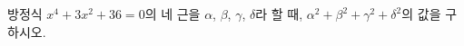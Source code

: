 방정식 $x^4+3x^2+36=0$의 네 근을 $\alpha$, $\beta$, $\gamma$, $\delta$라 할 때, $\alpha^2+\beta^2+\gamma^2+\delta^2$의 값을 구하시오.
